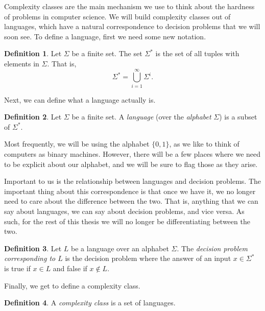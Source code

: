 \documentclass[english,12pt]{reedthesis}
\theoremstyle{plain}
\theoremstyle{definition}
\newtheorem{defn}[defn]{Definition}
\theoremstyle{remark}
\begin{document}
Complexity classes are the main mechanism we use to think about the hardness of
problems in computer science. We will build complexity classes out of languages,
which have a natural correspondence to decision problems that we will soon see.
To define a language, first we need some new notation.

\begin{defn}\label{def:sigma-star}
  Let $\Sigma$ be a finite set. The set $\Sigma^{*}$ is the set of all tuples with
  elements in $\Sigma$. That is,
  \begin{equation*}
    \Sigma^{*} = \bigcup_{i=1}^{\infty}\Sigma^{i}.
  \end{equation*}
\end{defn}

Next, we can define what a language actually is.

\begin{defn}\label{def:language}
  Let $\Sigma$ be a finite set. A \emph{language} (over the \emph{alphabet} $\Sigma$) is a
  subset of $\Sigma^{*}$.
\end{defn}

Most frequently, we will be using the alphabet $\{0, 1\}$, as we like to think
of computers as binary machines. However, there will be a few places where we
need to be explicit about our alphabet, and we will be sure to flag those as
they arise.

Important to us is the relationship between languages and decision problems. The
important thing about this correspondence is that once we have it, we no longer
need to care about the difference between the two. That is, anything that we can
say about languages, we can say about decision problems, and vice versa. As
such, for the rest of this thesis we will no longer be differentiating between
the two.

\begin{defn}
  Let $L$ be a language over an alphabet $\Sigma$. The \emph{decision problem
    corresponding to $L$} is the decision problem where the answer of an input
  $x \in \Sigma^{*}$ is true if $x \in L$ and false if $x \notin L$.
\end{defn}

Finally, we get to define a complexity class.

\begin{defn}
  A \emph{complexity class} is a set of languages.
\end{defn}
\end{document}
